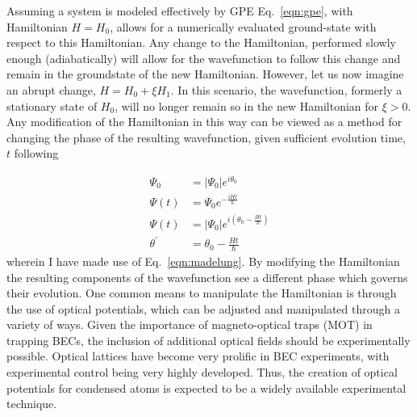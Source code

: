 Assuming a system is modeled effectively by GPE Eq.~\ref{eqn:gpe}, with Hamiltonian $H = H_0$, allows for a numerically evaluated ground-state with respect to this Hamiltonian. Any change to the Hamiltonian, performed slowly enough (adiabatically) will allow for the wavefunction to follow this change and remain in the groundstate of the new Hamiltonian. However, let us now imagine an abrupt change, $H = H_0 + \xi H_1$. In this scenario, the wavefunction, formerly a stationary state of $H_0$, will no longer remain so in the new Hamiltonian for $\xi > 0$. Any modification of the Hamiltonian in this way can be viewed as a method for changing the phase of the resulting wavefunction, given sufficient evolution time, $t$ following

\begin{subequations}
\begin{align}
    \Psi_0 &= |\Psi_0|e^{i\theta_0} \\
    \Psi(t) &= \Psi_0 e^{-\frac{i H t}{\hbar}} \\
    \Psi(t) &= |\Psi_0| e^{i\left(\theta_0 - \frac{H t}{\hbar}\right)} \\
    \theta^{'} &= \theta_0 - \frac{H t}{\hbar}
\end{align}
\end{subequations}
wherein I have made use of Eq.~\ref{eqn:madelung}. By modifying the Hamiltonian the resulting components of the wavefunction see a different phase which governs their evolution. One common means to manipulate the Hamiltonian is through the use of optical potentials, which can be adjusted and manipulated through a variety of ways. Given the importance of magneto-optical traps (MOT) in trapping BECs, the inclusion of additional optical fields should be experimentally possible. Optical lattices have become very prolific in BEC experiments, with experimental control being very highly developed. Thus, the creation of optical potentials for condensed atoms is expected to be a widely available experimental technique.

